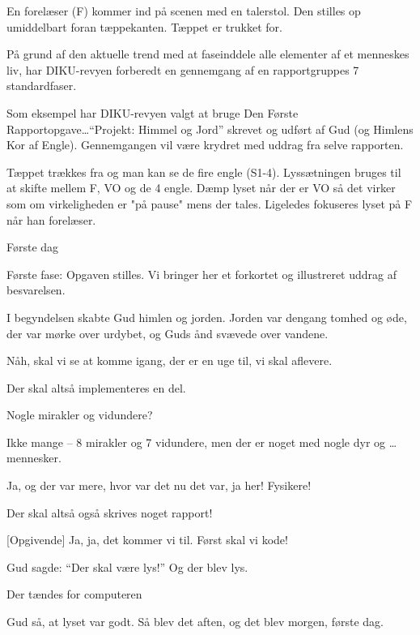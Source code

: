 \documentclass[danish]{article}
\begin{document}
\begin{sketch}

\scene En forelæser (F) kommer ind på scenen med en talerstol. Den stilles op
umiddelbart foran tæppekanten. Tæppet er trukket for.

 På grund af den aktuelle trend med at faseinddele alle elementer af et
menneskes liv, har DIKU-revyen forberedt en gennemgang af en rapportgruppes 7
standardfaser.

 Som eksempel har DIKU-revyen valgt at bruge Den Første
Rapportopgave\ldots ``Projekt: Himmel og Jord'' skrevet og udført af Gud (og
Himlens Kor af Engle). Gennemgangen vil være krydret med uddrag fra selve
rapporten.

\scene Tæppet trækkes fra og man kan se de fire engle (S1-4). Lyssætningen
bruges til at skifte mellem F, VO og de 4 engle. Dæmp lyset når der er VO så det
virker som om virkeligheden er "på pause" mens der tales. Ligeledes fokuseres
lyset på F når han forelæser.


\scene Første dag

 Første fase: Opgaven stilles. Vi bringer her et forkortet og
illustreret uddrag af besvarelsen.

 I begyndelsen skabte Gud himlen og jorden. Jorden var dengang tomhed
og øde, der var mørke over urdybet, og Guds ånd svævede over vandene.

 Nåh, skal vi se at komme igang, der er en uge til, vi skal aflevere.

 Der skal altså implementeres en del.

 Nogle mirakler og vidundere?

 Ikke mange -- 8 mirakler og 7 vidundere, men der er noget med nogle
dyr og \ldots mennesker.

 Ja, og der var mere, hvor var det nu det var, ja her! Fysikere!

 Der skal altså også skrives noget rapport!

[Opgivende] Ja, ja, det kommer vi til. Først skal vi kode!

 Gud sagde: ``Der skal være lys!'' Og der blev lys.

\scene Der tændes for computeren

 Gud så, at lyset var godt. Så blev det aften, og det blev morgen,
første dag.


\end{sketch}
\end{document}
